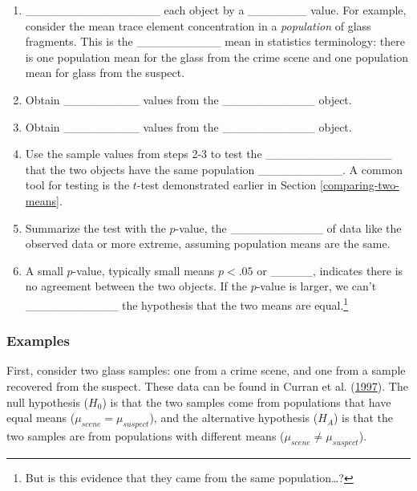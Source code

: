 \documentclass[]{book}
\providecommand{\tightlist}{%
  \setlength{\itemsep}{0pt}\setlength{\parskip}{0pt}}
\let\rmarkdownfootnote\footnote%
\def\footnote{\protect\rmarkdownfootnote}
\theoremstyle{definition}
\theoremstyle{definition}
\theoremstyle{remark}
\begin{document}
\begin{enumerate}
\def\labelenumi{\arabic{enumi}.}
\tightlist
\item
  \_\_\_\_\_\_\_\_\_\_\_\_\_\_\_\_ each object by a \_\_\_\_\_\_\_
  value. For example, consider the mean trace element concentration in a
  \emph{population} of glass fragments. This is the \_\_\_\_\_\_\_\_\_\_
  mean in statistics terminology: there is one population mean for the
  glass from the crime scene and one population mean for glass from the
  suspect. \vspace{.1in}
\item
  Obtain \_\_\_\_\_\_\_\_\_ values from the \_\_\_\_\_\_\_\_\_\_\_
  object. \vspace{.1in}
\item
  Obtain \_\_\_\_\_\_\_\_\_ values from the \_\_\_\_\_\_\_\_\_\_\_
  object. \vspace{.1in}
\item
  Use the sample values from steps 2-3 to test the
  \_\_\_\_\_\_\_\_\_\_\_\_\_\_\_ that the two objects have the same
  population \_\_\_\_\_\_\_\_\_\_. A common tool for testing is the
  \(t\)-test demonstrated earlier in Section \ref{comparing-two-means}.
  \vspace{.1in}
\item
  Summarize the test with the \(p\)-value, the \_\_\_\_\_\_\_\_\_\_\_ of
  data like the observed data or more extreme, assuming population means
  are the same. \vspace{.1in}
\item
  A small \(p\)-value, typically small means \(p < .05\) or \_\_\_\_\_,
  indicates there is no agreement between the two objects. If the
  \(p\)-value is larger, we can't \_\_\_\_\_\_\_\_\_\_\_ the hypothesis
  that the two means are equal.\footnote{But is this evidence that they
    came from the same population\ldots{}?}
\end{enumerate}

\subsubsection{Examples}\label{examples-4}

First, consider two glass samples: one from a crime scene, and one from
a sample recovered from the suspect. These data can be found in Curran
et al. (\protect\hyperlink{ref-curranetal}{1997}). The null hypothesis
(\(H_0\)) is that the two samples come from populations that have equal
means (\(\mu_{scene}=\mu_{suspect}\)), and the alternative hypothesis
(\(H_A\)) is that the two samples are from populations with different
means (\(\mu_{scene}\neq \mu_{suspect}\)).
\end{document}
